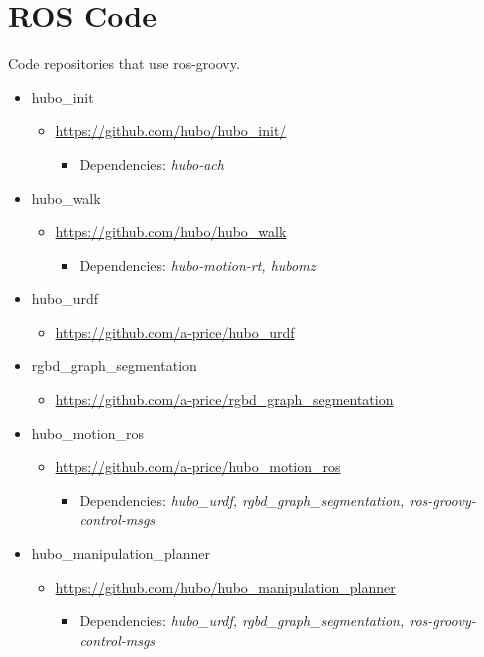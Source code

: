 \documentclass[letterpaper, 10 pt]{report}
\begin{document}
\section{ROS Code}
Code repositories that use ros-groovy.
\begin{itemize}
\item hubo\_init
  \begin{itemize}
	\item \url{https://github.com/hubo/hubo\_init/}
	  \begin{itemize}
	    \item Dependencies: \textit{hubo-ach}
	  \end{itemize}
  \end{itemize}
\item hubo\_walk
  \begin{itemize}
	\item \url{https://github.com/hubo/hubo\_walk}
	  \begin{itemize}
	    \item Dependencies: \textit{hubo-motion-rt, hubomz}
	  \end{itemize}
  \end{itemize}
\item hubo\_urdf
  \begin{itemize}
    \item \url{https://github.com/a-price/hubo\_urdf}
  \end{itemize}
\item rgbd\_graph\_segmentation
  \begin{itemize}
    \item \url{https://github.com/a-price/rgbd\_graph\_segmentation}
  \end{itemize}
\item hubo\_motion\_ros
  \begin{itemize}
	\item \url{https://github.com/a-price/hubo\_motion\_ros}
	  \begin{itemize}
	    \item Dependencies: \textit{hubo\_urdf, rgbd\_graph\_segmentation, ros-groovy-control-msgs}
	  \end{itemize}
  \end{itemize}
\item hubo\_manipulation\_planner
  \begin{itemize}
	\item \url{https://github.com/hubo/hubo\_manipulation\_planner}
	  \begin{itemize}
	    \item Dependencies: \textit{hubo\_urdf, rgbd\_graph\_segmentation, ros-groovy-control-msgs}
	  \end{itemize}
  \end{itemize}
\end{itemize}
\newpage
\end{document}
